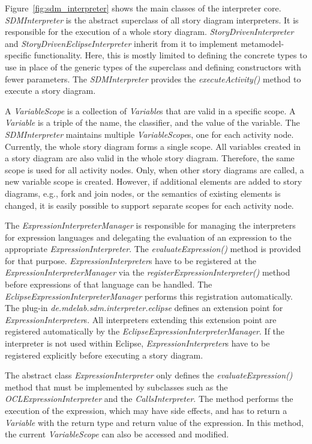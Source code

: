 Figure~\ref{fig:sdm_interpreter} shows the main classes of the interpreter core. 
\emph{SDMInterpreter} is the abstract superclass of all story diagram interpreters. 
It is responsible for the execution of a whole story diagram. 
\emph{StoryDrivenInterpreter} and \emph{StoryDrivenEclipseInterpreter} inherit from it to implement metamodel-specific functionality. 
Here, this is mostly limited to defining the concrete types to use in place of the generic types of the superclass and defining constructors with fewer parameters. 
The \emph{SDMInterpreter} provides the \emph{executeActivity()} method to execute a story diagram.

A \emph{VariableScope} is a collection of \emph{Variable}s that are valid in a specific scope.
A \emph{Variable} is a triple of the name, the classifier, and the value of the variable.
The \emph{SDMInterpreter} maintains multiple \emph{VariableScope}s, one for each activity node.
Currently, the whole story diagram forms a single scope.
All variables created in a story diagram are also valid in the whole story diagram. 
Therefore, the same scope is used for all activity nodes.
Only, when other story diagrams are called, a new variable scope is created. 
However, if additional elements are added to story diagrams, e.g., fork and join nodes, or the semantics of existing elements is changed, it is easily possible to support separate scopes for each activity node.

The \emph{ExpressionInterpreterManager} is responsible for managing the interpreters for expression languages and delegating the evaluation of an expression to the appropriate \emph{ExpressionInterpreter}. 
The \emph{evaluateExpression()} method is provided for that purpose. 
\emph{ExpressionInterpreter}s have to be registered at the \emph{ExpressionInterpreterManager} via the \emph{registerExpressionInterpreter()} method before expressions of that language can be handled. 
The \emph{EclipseExpressionInterpreterManager} performs this registration automatically. 
The plug-in \emph{de.mdelab.sdm.interpreter.eclipse} defines an extension point for \emph{ExpressionInterpreter}s. 
All interpreters extending this extension point are registered automatically by the \emph{EclipseExpressionInterpreterManager}. 
If the interpreter is not used within Eclipse, \emph{ExpressionInterpreter}s have to be registered explicitly before executing a story diagram.

The abstract class \emph{ExpressionInterpreter} only defines the \emph{evaluateExpression()} method that must be implemented by subclasses such as the \emph{OCLExpressionInterpreter} and the \emph{CallsInterpreter}. 
The method performs the execution of the expression, which may have side effects, and has to return a \emph{Variable} with the return type and return value of the expression. 
In this method, the current \emph{VariableScope} can also be accessed and modified.

